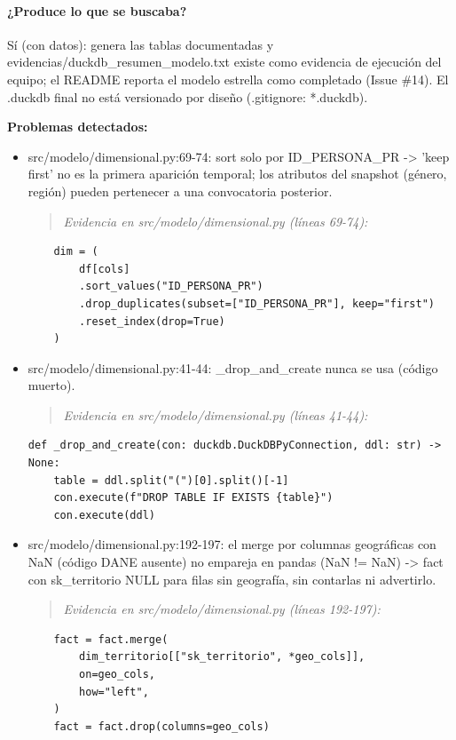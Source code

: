 \paragraph{¿Produce lo que se buscaba?}
Sí (con datos): genera las tablas documentadas y evidencias/duckdb\_resumen\_modelo.txt existe como evidencia de ejecución del equipo; el README reporta el modelo estrella como completado (Issue \#14). El .duckdb final no está versionado por diseño (.gitignore: *.duckdb).

\begin{tcolorbox}[riesgo]
\textbf{Problemas detectados:}
\begin{itemize}
  \item src/modelo/dimensional.py:69-74: sort solo por ID\_PERSONA\_PR -> 'keep first' no es la primera aparición temporal; los atributos del snapshot (género, región) pueden pertenecer a una convocatoria posterior.
\begin{quote}\footnotesize\ttfamily
\noindent\emph{Evidencia en src/modelo/dimensional.py (líneas 69-74):}
\end{quote}
\begin{lstlisting}
    dim = (
        df[cols]
        .sort_values("ID_PERSONA_PR")
        .drop_duplicates(subset=["ID_PERSONA_PR"], keep="first")
        .reset_index(drop=True)
    )
\end{lstlisting}

  \item src/modelo/dimensional.py:41-44: \_drop\_and\_create nunca se usa (código muerto).
\begin{quote}\footnotesize\ttfamily
\noindent\emph{Evidencia en src/modelo/dimensional.py (líneas 41-44):}
\end{quote}
\begin{lstlisting}
def _drop_and_create(con: duckdb.DuckDBPyConnection, ddl: str) -> None:
    table = ddl.split("(")[0].split()[-1]
    con.execute(f"DROP TABLE IF EXISTS {table}")
    con.execute(ddl)
\end{lstlisting}

  \item src/modelo/dimensional.py:192-197: el merge por columnas geográficas con NaN (código DANE ausente) no empareja en pandas (NaN != NaN) -> fact con sk\_territorio NULL para filas sin geografía, sin contarlas ni advertirlo.
\begin{quote}\footnotesize\ttfamily
\noindent\emph{Evidencia en src/modelo/dimensional.py (líneas 192-197):}
\end{quote}
\begin{lstlisting}
    fact = fact.merge(
        dim_territorio[["sk_territorio", *geo_cols]],
        on=geo_cols,
        how="left",
    )
    fact = fact.drop(columns=geo_cols)
\end{lstlisting}


\end{itemize}
\end{tcolorbox}
